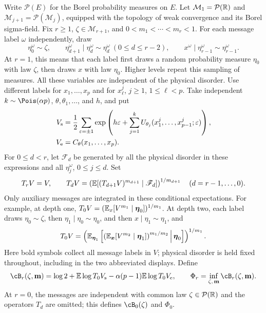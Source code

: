 Write $\mathcal P(E)$ for the Borel probability measures on $E$.
Let $\mathcal M_1=\mathcal P(\mathbb R)$ and
$\mathcal M_{j+1}=\mathcal P(\mathcal M_j)$, equipped with the topology of weak convergence and its Borel sigma-field. Fix $r\ge1$, $\zeta\in\mathcal M_{r+1}$, and
$0<m_1<\cdots<m_r<1$. For each message label $\omega$ independently, draw
\begin{equation}\label{model:chain}
 \eta_0^\omega\sim\zeta,\qquad
 \eta_{d+1}^\omega\mid\eta_d^\omega\sim\eta_d^\omega\ (0\le d\le r-2),
 \qquad x^\omega\mid\eta_{r-1}^\omega\sim\eta_{r-1}^\omega.
\end{equation}
At $r=1$, this means that each label first draws a random probability
measure $\eta_0$ with law $\zeta$, then draws $x$ with law $\eta_0$.
Higher levels repeat this sampling of measures. All these variables are
independent of the physical disorder. Use different
labels for $x_1,\ldots,x_p$ and for $x_\ell^j$, $j\ge1$, $1\le\ell<p$.
Take independent $k\sim\Pois(\alpha p)$, $\theta,\theta_1,\ldots$, and $h$,
and put
\begin{align}
 V_{\rm s}&=\frac12\sum_{\varepsilon=\pm1}
 \exp\left(h\varepsilon+\sum_{j=1}^k
 U_{\theta_j}(x_1^j,\ldots,x_{p-1}^j;\varepsilon)\right),\label{model:vs}\\
 V_{\rm e}&=C_\theta(x_1,\ldots,x_p).\label{model:ve}
\end{align}
For $0\le d<r$, let $\mathscr F_d$ be generated by all the physical disorder in these
expressions and all $\eta_j^\omega$, $0\le j\le d$. Set
\begin{equation}\label{model:power-means}
 T_rV=V,\qquad
 T_dV=\left(\mathbb E[(T_{d+1}V)^{m_{d+1}}\mid\mathscr F_d]\right)^{1/m_{d+1}}
 \quad(d=r-1,\ldots,0).
\end{equation}
Only auxiliary messages are integrated in these conditional expectations.
For example, at depth one,
$T_0V=(\mathbb E_x[V^{m_1}\mid\boldsymbol\eta_0])^{1/m_1}$.
At depth two, each label draws
$\eta_0\sim\zeta$, then $\eta_1\mid\eta_0\sim\eta_0$, and then
$x\mid\eta_1\sim\eta_1$, and
\[
 T_0V=\left(\mathbb E_{\boldsymbol\eta_1}
   \left[\left(\mathbb E_{\boldsymbol x}
      [V^{m_2}\mid\boldsymbol\eta_1]\right)^{m_1/m_2}
      \,\middle|\,\boldsymbol\eta_0\right]\right)^{1/m_1}.
\]
Here bold symbols collect all message labels in $V$; physical disorder is
held fixed throughout, including in the two abbreviated displays.
Define
\begin{equation}\label{model:functional}
 \cB_r(\zeta,\mathbf m)
 =\log2+\E\log T_0V_{\rm s}
 -\alpha(p-1)\E\log T_0V_{\rm e},
 \qquad \Phi_r=\inf_{\zeta,\,\mathbf m}\cB_r(\zeta,\mathbf m).
\end{equation}
At $r=0$, the messages are independent with common law
$\zeta\in\mathcal P(\mathbb R)$ and the operators $T_d$ are omitted; this defines
$\cB_0(\zeta)$ and $\Phi_0$.

